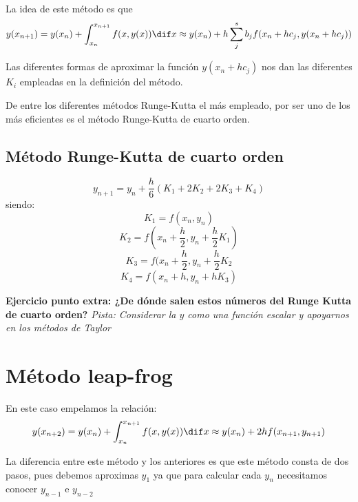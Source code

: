 \documentclass{apuntes}
\begin{document}
La idea de este método es que
\[y(x_{n+1}) = y(x_n) + \int_{x_n}^{x_{n+1}} f(x,y(x))\dif x \approx y(x_n)+h \sum_{j}^{s} b_j f(x_n+hc_j, y(x_n+hc_j))\]

Las diferentes formas de aproximar la función $y(x_n+hc_j)$ nos dan las diferentes $K_i$ empleadas en la definición del método.

De entre los diferentes métodos Runge-Kutta el más empleado, por ser uno de los más eficientes es el método Runge-Kutta de cuarto orden.

\subsection{Método Runge-Kutta de cuarto orden}
\[y_{n+1} = y_n +\frac{h}{6}(K_1+2K_2+2K_3+K_4)\]
siendo:
\[K_1 = f(x_n,y_n)\]
\[K_2 = f(x_n+\frac{h}{2}, y_n+\frac{h}{2}K_1)\]
\[K_3 = f(x_n+\frac{h}{2}, y_n + \frac{h}{2}K_2\]
\[K_4 = f(x_n+h, y_n + h K_3)\]

\textbf{Ejercicio punto extra: ¿De dónde salen estos números del Runge Kutta de cuarto orden?}
\textit{Pista: Considerar la $y$ como una función escalar y apoyarnos en los métodos de Taylor}

\section{Método leap-frog}
En este caso empelamos la relación:
\[y(x_{n+2}) = y(x_n) + \int_{x_n}^{x_{n+1}} f(x,y(x)) \dif x \approx y(x_n) + 2h f(x_{n+1},y_{n+1})\]

La diferencia entre este método y los anteriores es que este método consta de dos pasos, pues debemos aproximas $y_1$ ya que para calcular cada $y_n$ necesitamos conocer $y_{n-1}$ e $y_{n-2}$
\end{document}
